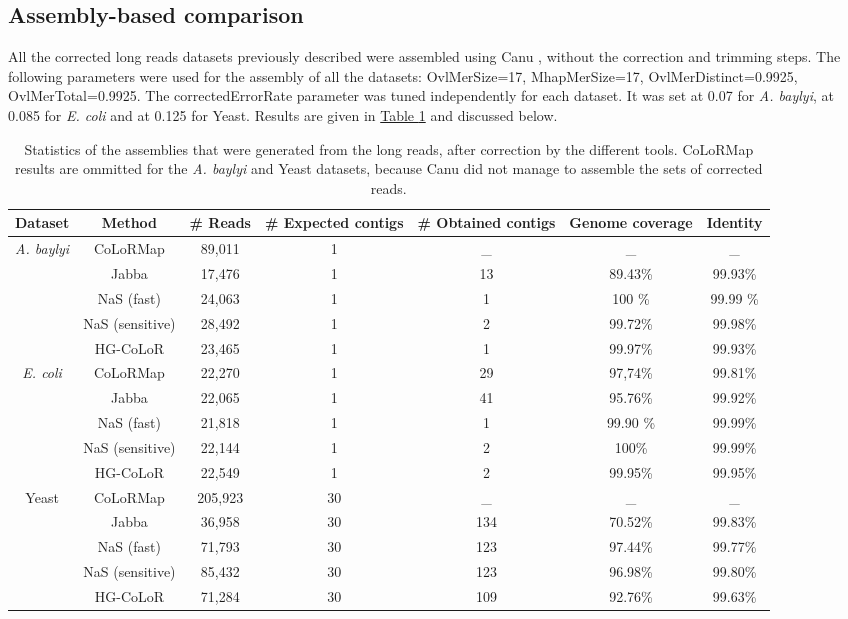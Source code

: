 \documentclass[long, final]{jobim2017}
\begin{document}
\subsection{Assembly-based comparison}
	
All the corrected long reads datasets previously described were assembled using Canu \cite{Koren2016}, without the correction and trimming steps. The following parameters were used for the assembly of all the datasets: OvlMerSize=17, MhapMerSize=17, OvlMerDistinct=0.9925, OvlMerTotal=0.9925. The correctedErrorRate parameter was tuned independently for each dataset. It was set at 0.07 for \emph{A. baylyi}, at 0.085 for \emph{E. coli} and at 0.125 for Yeast. Results are given in \hyperref[tabas]{Table \ref*{tabas}} and discussed below.

\begin{table}[ht]
	\begin{center}
	\begin{tabular}{|c|c|c|c|c|c|c|}
		\hline
		\textbf{Dataset} & \textbf{Method} & \textbf{\# Reads} & \textbf{\# Expected contigs} & \textbf{\# Obtained contigs} & \textbf{Genome coverage} 
		& \textbf{Identity} \\
		\hline
		\multirow{5}{*}{\emph{A. baylyi}} & CoLoRMap & 89,011 & 1 & \_ & \_ & \_ \\
		& Jabba & 17,476 & 1 & 13 & 89.43\% & 99.93\% \\
		& NaS (fast) & 24,063 & 1 & 1 & 100 \% & 99.99 \% \\
		& NaS (sensitive) & 28,492 & 1 & 2 & 99.72\% & 99.98\% \\
		& HG-CoLoR & 23,465 & 1 & 1 & 99.97\% & 99.93\% \\
		\hline
		\multirow{5}{*}{\emph{E. coli}} & CoLoRMap & 22,270 & 1 & 29 & 97,74\% & 99.81\% \\
		& Jabba & 22,065 & 1 & 41 & 95.76\% & 99.92\% \\
		& NaS (fast) & 21,818 & 1 & 1 & 99.90 \% & 99.99\% \\
		& NaS (sensitive) & 22,144 & 1 & 2 & 100\% & 99.99\% \\
		& HG-CoLoR & 22,549 & 1 & 2 & 99.95\% & 99.95\% \\
		\hline
		\multirow{5}{*}{Yeast} & CoLoRMap & 205,923 & 30 & \_ & \_ & \_ \\
		& Jabba & 36,958 & 30 & 134 & 70.52\% & 99.83\% \\
		& NaS (fast) & 71,793 & 30 & 123 & 97.44\% & 99.77\% \\
		& NaS (sensitive) & 85,432 & 30 & 123 & 96.98\% & 99.80\% \\
		& HG-CoLoR & 71,284 & 30 & 109 & 92.76\% & 99.63\% \\
		\hline
	\end{tabular}
	\end{center}
	\caption{Statistics of the assemblies that were generated from the long reads, after correction by the different tools. CoLoRMap results are ommitted 
	for the \emph{A. baylyi} and Yeast datasets, because Canu did not manage to assemble the sets of corrected reads.
	\label{tabas}}
\end{table}
\end{document}
